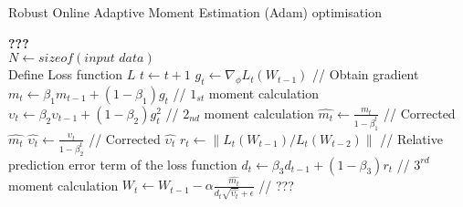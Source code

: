 \begin{algorithm}
  \caption{Robust Online Adaptive Moment Estimation (Adam) optimisation}
  \begin{algorithmic}[1]
    \STATE \textbf{???} \\ $N\gets sizeof(\textit{input data})$\\
    \STATE Define Loss function $L$
    \STATE $t \gets t+1$
    \STATE $g_t \gets \nabla_\phi L_t (W_{t-1})$ // Obtain gradient
    \STATE $m_t \gets \beta_1 m_{t-1}+(1-\beta_1) g_t $ // $1_{st}$ moment calculation
    \STATE $\upsilon_t \gets \beta_2 \upsilon_{t-1}+ \left(1-\beta_2 \right)g^2_t $ // $2_{nd}$ moment calculation
    \STATE $\hat{m_t} \gets \frac{m_t}{1-\beta^t_1}$ // Corrected $\hat{m_t}$
    \STATE $\hat{\upsilon_t} \gets \frac{\upsilon_t}{1-\beta^t_2} $ // Corrected $\hat{\upsilon_t}$
    \STATE $r_t \gets \parallel L_t\left(W_{t-1}\right)/L_t\left(W_{t-2}\right) \parallel $ // Relative prediction error term of the loss function
    \STATE $d_t \gets \beta_3 d_{t-1}+\left(1-\beta_3\right)r_t $ // $3^{rd}$ moment calculation
    \STATE $W_t \gets W_{t-1}- \alpha \frac{\hat{m_t}}{d_t\sqrt{\hat{\upsilon_t}}+\epsilon} $ // ???
    \ENDWHILE
  \end{algorithmic}
  \label{alg:RoAdam}
\end{algorithm}
